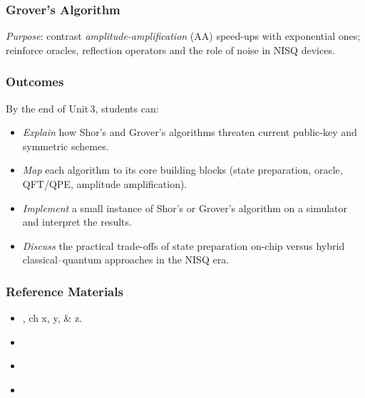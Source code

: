 \subsubsection{Grover’s Algorithm}

\emph{Purpose}: contrast \emph{amplitude-amplification} (AA) speed-ups with exponential ones; 
reinforce oracles, reflection operators and the role of noise in NISQ devices.




\subsubsection{Outcomes}

By the end of Unit 3, students can:
\begin{itemize}
	\item \emph{Explain} how Shor’s and Grover’s algorithms threaten current public-key and symmetric schemes.

	\item \emph{Map} each algorithm to its core building blocks (state preparation, oracle, QFT/QPE, amplitude amplification).

	\item \emph{Implement} a small instance of Shor’s or Grover’s algorithm on a simulator and interpret the results.

	\item \emph{Discuss} the practical trade-offs of state preparation on-chip versus hybrid classical–quantum approaches in the NISQ era.
\end{itemize}


\subsubsection{Reference Materials}
\begin{itemize}
	\item \citeauthor{Lipton:2021} \citeauthor{Lipton:2021}, ch x, y, \& z.
	\item \citeauthor{Nielsen:2010} \citeauthor{Nielsen:2010}
	\item \citeauthor{Shor:1997} 
	\item \citeauthor{Grover:1996} 
\end{itemize}

